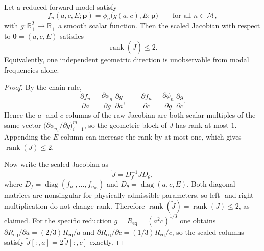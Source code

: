 \begin{theorem}
\label{thm:p10_scalar_reduction}
Let a reduced forward model satisfy
\begin{equation}
  f_n(a,c,E;\mathbf{p}) = \phi_n\!\bigl(g(a,c),E;\mathbf{p}\bigr)
  \qquad \text{for all } n \in \mathcal{M},
  \label{eq:p10_scalar_model}
\end{equation}
with $g:\mathbb{R}^2_{+}\to\mathbb{R}_{+}$ a smooth scalar function.  Then the
scaled Jacobian with respect to $\boldsymbol{\theta}=(a,c,E)$ satisfies
\begin{equation}
  \operatorname{rank}(\widetilde{J}) \leq 2.
  \label{eq:p10_rank_bound}
\end{equation}
Equivalently, one independent geometric direction is unobservable from modal
frequencies alone.
\end{theorem}

\begin{proof}
By the chain rule,
\begin{equation}
  \frac{\partial f_n}{\partial a}
  =
  \frac{\partial \phi_n}{\partial g}\,
  \frac{\partial g}{\partial a},
  \qquad
  \frac{\partial f_n}{\partial c}
  =
  \frac{\partial \phi_n}{\partial g}\,
  \frac{\partial g}{\partial c}.
  \label{eq:p10_chain_rule_columns}
\end{equation}
Hence the $a$- and $c$-columns of the raw Jacobian are both scalar multiples of
the same vector
$\bigl(\partial \phi_{n_i}/\partial g\bigr)_{i=1}^m$, so the geometric block of
$J$ has rank at most $1$.  Appending the $E$-column can increase the rank by at
most one, which gives $\operatorname{rank}(J)\leq 2$.

Now write the scaled Jacobian as
\begin{equation}
  \widetilde{J}
  =
  D_f^{-1} J D_\theta,
\end{equation}
where $D_f=\operatorname{diag}(f_{n_1},\ldots,f_{n_m})$ and
$D_\theta=\operatorname{diag}(a,c,E)$.  Both diagonal matrices are nonsingular
for physically admissible parameters, so left- and right-multiplication do not
change rank.  Therefore
$\operatorname{rank}(\widetilde{J})=\operatorname{rank}(J)\leq 2$, as claimed.
For the specific reduction $g=R_\mathrm{eq}=(a^2c)^{1/3}$ one obtains
$\partial R_\mathrm{eq}/\partial a=(2/3)R_\mathrm{eq}/a$ and
$\partial R_\mathrm{eq}/\partial c=(1/3)R_\mathrm{eq}/c$, so the scaled columns
satisfy $\widetilde{J}[:,a]=2\,\widetilde{J}[:,c]$ exactly. 
\end{proof}


